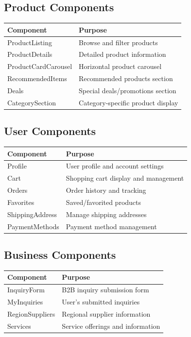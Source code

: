 \documentclass[12pt,a4paper]{report}
\begin{document}
\subsection{Product Components}

\begin{longtable}{|p{3cm}|p{5cm}|}
\hline
\textbf{Component} & \textbf{Purpose} \\
\hline
ProductListing & Browse and filter products \\
\hline
ProductDetails & Detailed product information \\
\hline
ProductCardCarousel & Horizontal product carousel \\
\hline
RecommendedItems & Recommended products section \\
\hline
Deals & Special deals/promotions section \\
\hline
CategorySection & Category-specific product display \\
\hline
\end{longtable}

\subsection{User Components}

\begin{longtable}{|p{3cm}|p{5cm}|}
\hline
\textbf{Component} & \textbf{Purpose} \\
\hline
Profile & User profile and account settings \\
\hline
Cart & Shopping cart display and management \\
\hline
Orders & Order history and tracking \\
\hline
Favorites & Saved/favorited products \\
\hline
ShippingAddress & Manage shipping addresses \\
\hline
PaymentMethods & Payment method management \\
\hline
\end{longtable}

\subsection{Business Components}

\begin{longtable}{|p{3cm}|p{5cm}|}
\hline
\textbf{Component} & \textbf{Purpose} \\
\hline
InquiryForm & B2B inquiry submission form \\
\hline
MyInquiries & User's submitted inquiries \\
\hline
RegionSuppliers & Regional supplier information \\
\hline
Services & Service offerings and information \\
\hline
\end{longtable}
\end{document}
